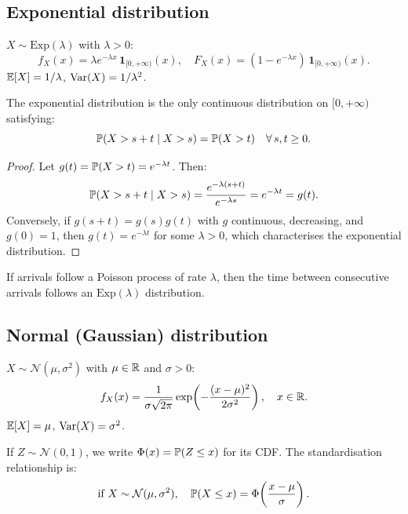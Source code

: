 \subsection{Exponential distribution}

\begin{definition}[Exponential]
$X \sim \mathrm{Exp}(\lambda)$ with $\lambda > 0$:
\[
    f_X(x) = \lambda e^{-\lambda x}\,\mathbf{1}_{[0,+\infty)}(x), \quad
    F_X(x) = (1 - e^{-\lambda x})\,\mathbf{1}_{[0,+\infty)}(x).
\]
$\mathbb{E}[X] = 1/\lambda$, $\mathrm{Var}(X) = 1/\lambda^2$.
\end{definition}

\begin{theorem}[Memorylessness]
The exponential distribution is the only continuous distribution on $[0,+\infty)$
satisfying:
\[
    \mathbb{P}(X > s + t \mid X > s) = \mathbb{P}(X > t) \quad \forall\, s, t \geq 0.
\]
\end{theorem}

\begin{proof}
Let $g(t) = \mathbb{P}(X > t) = e^{-\lambda t}$. Then:
\[
    \mathbb{P}(X > s+t \mid X > s) = \frac{e^{-\lambda(s+t)}}{e^{-\lambda s}}
    = e^{-\lambda t} = g(t).
\]
Conversely, if $g(s+t) = g(s)g(t)$ with $g$ continuous, decreasing, and $g(0)=1$,
then $g(t) = e^{-\lambda t}$ for some $\lambda > 0$, which characterises the
exponential distribution.
\end{proof}

\begin{intuition}[title=\textbf{Exponential and Poisson}]
If arrivals follow a Poisson process of rate $\lambda$, then the time between
consecutive arrivals follows an $\mathrm{Exp}(\lambda)$ distribution.
\end{intuition}

\subsection{Normal (Gaussian) distribution}

\begin{definition}
$X \sim \mathcal{N}(\mu, \sigma^2)$ with $\mu \in \mathbb{R}$ and $\sigma > 0$:
\[
    f_X(x) = \frac{1}{\sigma\sqrt{2\pi}}
    \exp\!\left(-\frac{(x-\mu)^2}{2\sigma^2}\right), \quad x \in \mathbb{R}.
\]
$\mathbb{E}[X] = \mu$, $\mathrm{Var}(X) = \sigma^2$.
\end{definition}

\begin{definition}
If $Z \sim \mathcal{N}(0,1)$, we write $\Phi(x) = \mathbb{P}(Z \leq x)$ for its CDF.
The standardisation relationship is:
\[
    \text{if } X \sim \mathcal{N}(\mu, \sigma^2), \quad
    \mathbb{P}(X \leq x) = \Phi\!\left(\frac{x - \mu}{\sigma}\right).
\]
\end{definition}

